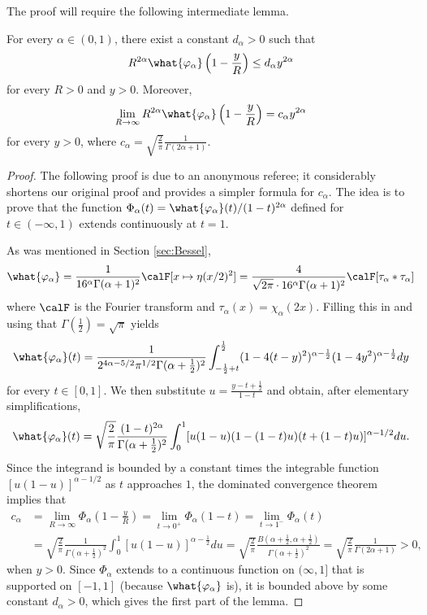 \documentclass[12pt]{amsart}
\numberwithin{equation}{section}
\begin{document}
The proof will require the following intermediate lemma.

\begin{lem}  \label{lem:behaviour_near_end}
For every $\alpha \in (0,1)$, there exist a constant $d_\alpha > 0$ such that
\[
R^{2\alpha} \what{\varphi_\alpha}\left(1-\frac{y}{R}\right) \leq d_\alpha y^{2\alpha}
\]
for every $R>0$ and $y> 0$. Moreover,
\[
\lim_{R\to \infty} R^{2\alpha} \what{\varphi_\alpha}\left(1-\frac{y}{R}\right) = c_\alpha y^{2\alpha}
\]
 for every $y > 0$, where $c_\alpha=\sqrt{\frac{2}{\pi}} \frac{1}{\Gamma(2\alpha+1)}$.
\end{lem}
 
\begin{proof} The following proof is due to an anonymous referee; it considerably shortens our original proof and provides a simpler formula for $c_\alpha$. The idea is to prove that the function $\Phi_\alpha(t) = \what{\varphi_\alpha}(t)/(1-t)^{2\alpha}$ defined for $t \in (-\infty, 1)$ extends continuously at $t=1$.

As was mentioned in Section \ref{sec:Bessel},
\[
\what{\varphi_\alpha} = \frac{1}{16^\alpha \Gamma(\alpha+1)^2} \calF[x \mapsto \eta(x/2)^2] = \frac{4}{\sqrt{2\pi}\cdot 16^\alpha \Gamma(\alpha+1)^2} \calF[\tau_\alpha\ast \tau_\alpha]
\]
where $\calF$ is the Fourier transform and $\tau_\alpha(x) = \chi_\alpha(2x)$. Filling this in and using that $\Gamma(\frac{1}{2})=\sqrt{\pi}$ yields
\[
\what{\varphi_\alpha}(t) = \frac{1}{2^{4\alpha-5/2}\pi^{1/2}\Gamma(\alpha+\frac{1}{2})^2} \int_{-\frac{1}{2}+t}^{\frac{1}{2}} (1-4(t-y)^2)^{\alpha-\frac{1}{2}} (1-4y^2)^{\alpha-\frac{1}{2}} dy
\]
for every $t \in [0,1]$. We then substitute $u = \frac{y-t+\frac{1}{2}}{1-t}$ and obtain, after elementary simplifications,
\[
\what{\varphi_\alpha}(t) =\sqrt{\frac{2}{\pi}} \frac{(1-t)^{2\alpha}}{\Gamma(\alpha+\frac{1}{2})^2} \int_0^1 [u(1-u)(1-(1-t)u)(t+(1-t)u)]^{\alpha-1/2} du.
\]
Since the integrand is bounded by a constant times the integrable function $[u(1-u)]^{\alpha-1/2}$ as $t$ approaches $1$, the dominated convergence theorem implies that
\begin{align*}
c_\alpha &=  \lim_{R\to \infty}\Phi_\alpha\left(1-\frac{y}{R}\right) = \lim_{t\to 0^+}\Phi_\alpha(1-t) = \lim_{t\to 1^-}\Phi_\alpha(t) \\
&= \sqrt{\frac{2}{\pi}} \frac{1}{\Gamma(\alpha+\frac{1}{2})^2} \int_0^1 [u(1-u)]^{\alpha-\frac{1}{2}}du= \sqrt{\frac{2}{\pi}} \frac{B(\alpha+\frac{1}{2},\alpha+\frac{1}{2})}{\Gamma(\alpha+\frac{1}{2})^2} = \sqrt{\frac{2}{\pi}} \frac{1}{\Gamma(2\alpha+1)}>0,
\end{align*}
when $y>0$. Since $\Phi_\alpha$ extends to a continuous function on $(\infty,1]$ that is supported on $[-1,1]$ (because $\what{\varphi_\alpha}$ is), it is bounded above by some constant $d_\alpha > 0$, which gives the first part of the lemma.
\end{proof}
\end{document}
